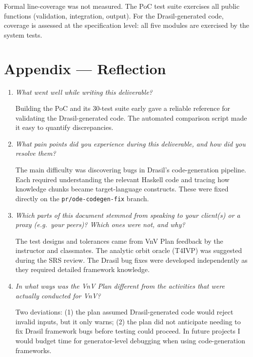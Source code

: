 \documentclass[12pt, titlepage]{article}
\begin{document}
Formal line-coverage was not measured. The PoC test suite exercises all public
functions (validation, integration, output). For the Drasil-generated code,
coverage is assessed at the specification level: all five modules are exercised
by the system tests.




\newpage{}
\section*{Appendix --- Reflection}



\begin{enumerate}
  \item \textit{What went well while writing this deliverable?}

  Building the PoC and its 30-test suite early gave a reliable reference for
  validating the Drasil-generated code. The automated comparison script made
  it easy to quantify discrepancies.

  \item \textit{What pain points did you experience during this deliverable, and
  how did you resolve them?}

  The main difficulty was discovering bugs in Drasil's code-generation
  pipeline. Each required understanding the relevant Haskell code and tracing
  how knowledge chunks became target-language constructs. These were fixed
  directly on the \texttt{pr/ode-codegen-fix} branch.

  \item \textit{Which parts of this document stemmed from speaking to your
  client(s) or a proxy (e.g.\ your peers)? Which ones were not, and why?}

  The test designs and tolerances came from VnV Plan feedback by the instructor
  and classmates. The analytic orbit oracle (T4IVP) was suggested during the SRS
  review. The Drasil bug fixes were developed independently as they required
  detailed framework knowledge.

  \item \textit{In what ways was the VnV Plan different from the activities that
  were actually conducted for VnV?}

  Two deviations: (1) the plan assumed Drasil-generated code would reject
  invalid inputs, but it only warns; (2) the plan did not anticipate needing to
  fix Drasil framework bugs before testing could proceed. In future
  projects I would budget time for generator-level debugging when using
  code-generation frameworks.
\end{enumerate}
\end{document}
